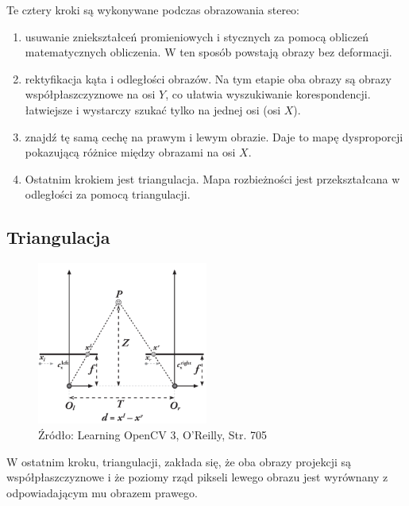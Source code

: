 \documentclass[magisterska]{pracadypl}
\begin{document}
Te cztery kroki są wykonywane podczas obrazowania stereo:

\begin{enumerate}
  \item usuwanie zniekształceń promieniowych i stycznych za pomocą obliczeń matematycznych
obliczenia. W ten sposób powstają obrazy bez deformacji.
  \item rektyfikacja kąta i odległości obrazów. Na tym etapie oba obrazy są
obrazy współpłaszczyznowe na osi $Y$, co ułatwia wyszukiwanie korespondencji.
łatwiejsze i wystarczy szukać tylko na jednej osi (osi $X$).
  \item znajdź tę samą cechę na prawym i lewym obrazie. Daje to mapę dysproporcji pokazującą różnice między obrazami na osi $X$.
  \item Ostatnim krokiem jest triangulacja. Mapa rozbieżności jest przekształcana w odległości za pomocą triangulacji.
\end{enumerate}

\subsection{Triangulacja}

\begin{figure}[h]  %
    \centering  %
    \includegraphics[width=0.5\textwidth]{images/triangulation.png}  %
    \captionsetup{labelformat=empty, font=footnotesize}
    \caption{Źródło: Learning OpenCV 3, O'Reilly, Str. 705}
    \label{fig:rpi}  %
\end{figure}

W ostatnim kroku, triangulacji, zakłada się, że oba obrazy projekcji są współpłaszczyznowe i że poziomy rząd pikseli lewego obrazu jest wyrównany z odpowiadającym mu obrazem prawego.
\end{document}
